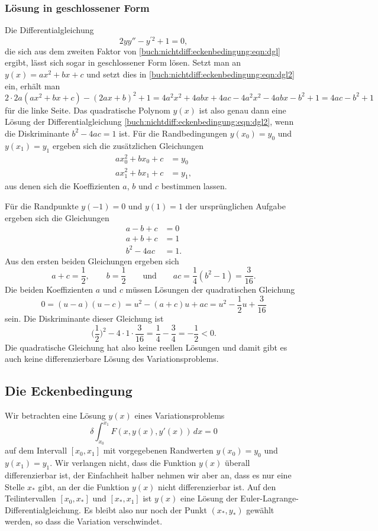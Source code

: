 %
%
\subsubsection{Lösung in geschlossener Form}
Die Differentialgleichung
\begin{equation}
2yy'' - y^{\prime 2} + 1 = 0,
\label{buch:nichtdiff:eckenbedingung:eqn:dgl2}
\end{equation}
die sich aus dem zweiten Faktor von
\eqref{buch:nichtdiff:eckenbedingung:eqn:dgl}
ergibt, lässt sich sogar in geschlossener Form lösen.
Setzt man an $y(x)=ax^2+bx+c$ und setzt dies in
\eqref{buch:nichtdiff:eckenbedingung:eqn:dgl2} ein, erhält man
\[
2\cdot2a(ax^2+bx+c) - (2ax+b)^2 + 1 
=
4a^2x^2 + 4abx + 4ac - 4a^2x^2 -4abx-b^2 + 1
=
4ac-b^2+1
\]
für die linke Seite.
Das quadratische Polynom $y(x)$ ist also genau dann eine Lösung
der Differentialgleichung
\eqref{buch:nichtdiff:eckenbedingung:eqn:dgl2},
wenn die Diskriminante $b^2-4ac=1$ ist.
Für die Randbedingungen $y(x_0)=y_0$ und $y(x_1)=y_1$ ergeben sich die
zusätzlichen Gleichungen
\begin{equation*}
\begin{aligned}
ax_0^2+bx_0+c&=y_0
\\
ax_1^2+bx_1+c&=y_1,
\end{aligned}
\end{equation*}
aus denen sich die Koeffizienten $a$, $b$ und $c$ bestimmen lassen.

Für die Randpunkte $y(-1)=0$ und $y(1)=1$ der ursprünglichen Aufgabe
ergeben sich die Gleichungen
\begin{align*}
a-b+c&=0\\
a+b+c&=1\\
b^2-4ac&=1.
\end{align*}
Aus den ersten beiden Gleichungen ergeben sich
\[
a+c=\frac12, \qquad b=\frac12
\qquad\text{und}\qquad
ac = \frac14(b^2-1) = \frac{3}{16}.
\]
Die beiden Koeffizienten $a$ und $c$ müssen Lösungen der
quadratischen Gleichung
\[
0
=
(u-a)(u-c)
=
u^2 -(a+c)u+ac
=
u^2-\frac12u+\frac{3}{16}
\]
sein.
Die Diskriminante dieser Gleichung ist
\[
\biggl(\frac12\biggr)^2
-4\cdot1\cdot\frac{3}{16}
=
\frac14-\frac{3}{4}
=
-\frac12
<0.
\]
Die quadratische Gleichung hat also keine reellen Lösungen und damit
gibt es auch keine differenzierbare Lösung des Variationsproblems.

%
%
\subsection{Die Eckenbedingung
\label{buch:nichtdiff:eckenbedingung:subsection:eckenbedingung}}
Wir betrachten eine Lösung $y(x)$ eines Variationsproblems 
\[
\delta
\int_{x_0}^{x_1}
F(x,y(x),y'(x))
\,dx
=
0
\]
auf dem Intervall $[x_0,x_1]$ mit vorgegebenen Randwerten 
$y(x_0)=y_0$ und $y(x_1)=y_1$.
Wir verlangen nicht, dass die Funktion $y(x)$ überall differenzierbar
ist, der Einfachheit halber nehmen wir aber an, dass es nur eine
Stelle $x_*$ gibt, an der die Funktion $y(x)$ nicht differenzierbar ist.
Auf den Teilintervallen $[x_0,x_*]$ und $[x_*,x_1]$ ist $y(x)$ eine
Lösung der Euler-Lagrange-Differentialgleichung.
Es bleibt also nur noch der Punkt $(x_*,y_*)$ gewählt werden, so dass
die Variation verschwindet.

